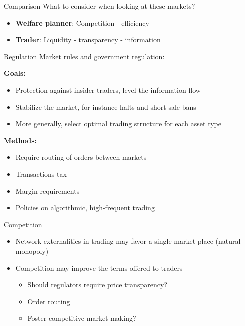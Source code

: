 \documentclass[english,10pt]{beamer}
\theoremstyle{definition}
\begin{document}
\begin{frame}{Comparison}
	What to consider when looking at these markets?
	\begin{itemize}
		\item \textbf{Welfare planner}: Competition - efficiency 
		\item \textbf{Trader}: Liquidity - transparency - information
	\end{itemize}
\end{frame}


\begin{frame}{Regulation}
	Market rules and government regulation:
	
	\textbf{Goals:}
	\begin{itemize}
		\item Protection against insider traders, level the information flow
		\item Stabilize the market, for instance halts and short-sale bans
		\item More generally, select optimal trading structure for each asset type
	\end{itemize}
	\textbf{Methods:}
	\begin{itemize}
		\item Require routing of orders between markets
		\item Transactions tax
		\item Margin requirements
		\item Policies on algorithmic, high-frequent trading
	\end{itemize}
\end{frame}


\begin{frame}{Competition}
\begin{itemize}
	\item Network externalities in trading may favor a single market place (natural monopoly)
	\item Competition may improve the terms offered to traders
	\begin{itemize}
		\item Should regulators require price transparency?
		\item Order routing
		\item Foster competitive market making?
	\end{itemize}
\end{itemize}
\end{frame}
\end{document}
